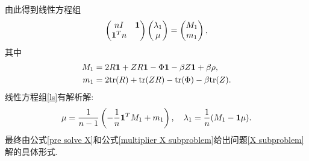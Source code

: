 由此得到线性方程组
\begin{equation}
	\begin{pmatrix}
		nI & \mathbf{1}\\\mathbf{1}^T n
	\end{pmatrix}\begin{pmatrix}
		\lambda_1\\\mu
	\end{pmatrix}=\begin{pmatrix}
		M_1\\m_1
	\end{pmatrix},
	\label{ls}
\end{equation}
其中
$$\begin{aligned}
	M_1&=2R\mathbf{1}+ZR\mathbf{1}-\Phi \mathbf{1}-\beta Z\mathbf{1}+\beta\rho,\\
	m_1&=2\mathrm{tr}(R)+\mathrm{tr}(ZR)-\mathrm{tr}(\Phi)-\beta\mathrm{tr}(Z).
\end{aligned}$$
线性方程组\eqref{ls}有解析解:
\begin{equation}
	\mu=\frac{1}{n-1}\left(-\frac{1}{n}\mathbf{1}^TM_1+m_1\right),\quad\lambda_1=\frac{1}{n}(M_1-\mathbf{1}\mu).
	\label{multiplier X subproblem}
\end{equation}
最终由公式\eqref{pre solve X}和公式\eqref{multiplier X subproblem}给出问题\eqref{X subproblem}解的具体形式. 

